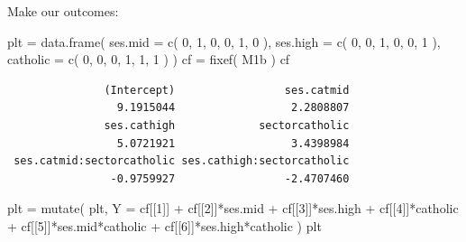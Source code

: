 \documentclass[
  letterpaper,
  DIV=11,
  numbers=noendperiod]{scrreprt}
\newenvironment{Shaded}{\begin{snugshade}}{\end{snugshade}}
\newcommand{\AttributeTok}[1]{\textcolor[rgb]{0.49,0.56,0.16}{#1}}
\newcommand{\DecValTok}[1]{\textcolor[rgb]{0.25,0.63,0.44}{#1}}
\newcommand{\FunctionTok}[1]{\textcolor[rgb]{0.02,0.16,0.49}{#1}}
\newcommand{\NormalTok}[1]{\textcolor[rgb]{0.00,0.44,0.13}{#1}}
\newcommand{\OtherTok}[1]{\textcolor[rgb]{0.00,0.44,0.13}{#1}}
\newcommand{\SpecialCharTok}[1]{\textcolor[rgb]{0.25,0.44,0.63}{#1}}
\begin{document}
Make our outcomes:

\begin{Shaded}
\begin{Highlighting}[]
\NormalTok{plt }\OtherTok{=} \FunctionTok{data.frame}\NormalTok{( }\AttributeTok{ses.mid =} \FunctionTok{c}\NormalTok{( }\DecValTok{0}\NormalTok{, }\DecValTok{1}\NormalTok{, }\DecValTok{0}\NormalTok{, }\DecValTok{0}\NormalTok{, }\DecValTok{1}\NormalTok{, }\DecValTok{0}\NormalTok{ ),}
                  \AttributeTok{ses.high =} \FunctionTok{c}\NormalTok{( }\DecValTok{0}\NormalTok{, }\DecValTok{0}\NormalTok{, }\DecValTok{1}\NormalTok{, }\DecValTok{0}\NormalTok{, }\DecValTok{0}\NormalTok{, }\DecValTok{1}\NormalTok{ ),}
                  \AttributeTok{catholic =} \FunctionTok{c}\NormalTok{( }\DecValTok{0}\NormalTok{, }\DecValTok{0}\NormalTok{, }\DecValTok{0}\NormalTok{, }\DecValTok{1}\NormalTok{, }\DecValTok{1}\NormalTok{, }\DecValTok{1}\NormalTok{ ) )}
\NormalTok{cf }\OtherTok{=} \FunctionTok{fixef}\NormalTok{( M1b )}
\NormalTok{cf}
\end{Highlighting}
\end{Shaded}

\begin{verbatim}
               (Intercept)                 ses.catmid 
                 9.1915044                  2.2808807 
               ses.cathigh             sectorcatholic 
                 5.0721921                  3.4398984 
 ses.catmid:sectorcatholic ses.cathigh:sectorcatholic 
                -0.9759927                 -2.4707460 
\end{verbatim}

\begin{Shaded}
\begin{Highlighting}[]
\NormalTok{plt }\OtherTok{=} \FunctionTok{mutate}\NormalTok{( plt,}
              \AttributeTok{Y =}\NormalTok{ cf[[}\DecValTok{1}\NormalTok{]] }\SpecialCharTok{+}\NormalTok{ cf[[}\DecValTok{2}\NormalTok{]]}\SpecialCharTok{*}\NormalTok{ses.mid }\SpecialCharTok{+}\NormalTok{ cf[[}\DecValTok{3}\NormalTok{]]}\SpecialCharTok{*}\NormalTok{ses.high }\SpecialCharTok{+}
\NormalTok{                cf[[}\DecValTok{4}\NormalTok{]]}\SpecialCharTok{*}\NormalTok{catholic }\SpecialCharTok{+}\NormalTok{ cf[[}\DecValTok{5}\NormalTok{]]}\SpecialCharTok{*}\NormalTok{ses.mid}\SpecialCharTok{*}\NormalTok{catholic }\SpecialCharTok{+}\NormalTok{ cf[[}\DecValTok{6}\NormalTok{]]}\SpecialCharTok{*}\NormalTok{ses.high}\SpecialCharTok{*}\NormalTok{catholic )}
\NormalTok{plt}
\end{Highlighting}
\end{Shaded}
\end{document}

